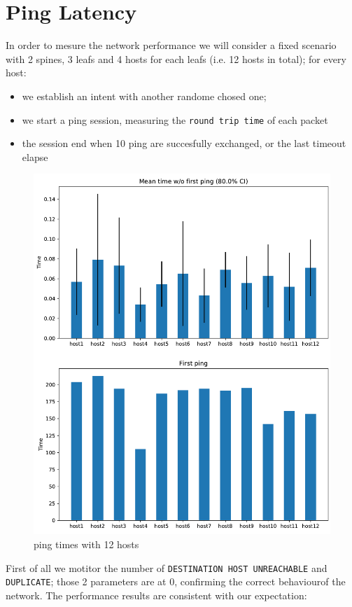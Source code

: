 \section{Ping Latency}
In order to mesure the network performance we will consider a fixed scenario with 2 spines, 3 leafs and 4 hosts for each leafs (i.e. 12 hosts in total);
for every host:
\begin{itemize}
    \item  we establish an intent with another randome chosed one;
    \item  we start a ping session, measuring the \texttt{round trip time} of each packet
    \item  the session end when 10 ping are succesfully exchanged, or the last timeout elapse
\end{itemize} 
\begin{figure}[h]
    \centering
    \includegraphics[width=.92\textwidth]{img/mean_ping_time.pdf}
    \caption{ping times with 12 hosts}
\end{figure}
First of all we motitor the number of \texttt{DESTINATION HOST UNREACHABLE} and \texttt{DUPLICATE}; those 2 parameters are at 0, confirming the correct
behaviourof the network.
The performance results are consistent with our expectation:
